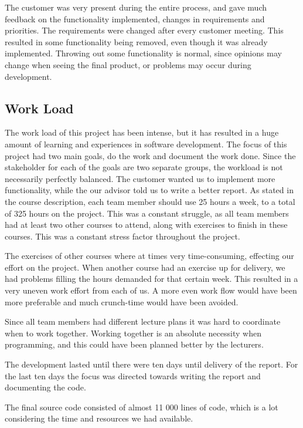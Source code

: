 The customer was very present during the entire process, and gave much feedback on the functionality implemented, changes in requirements and priorities. The requirements were changed after every customer meeting. This resulted in some functionality being removed, even though it was already implemented. Throwing out some functionality is normal, since opinions may change when seeing the final product, or problems may occur during development. 



\subsection{Work Load}
The work load of this project has been intense, but it has resulted in a huge amount of learning and experiences in software development.
The focus of this project had two main goals, do the work and document the work done. Since the stakeholder for each of the goals are two separate groups, the workload is not necessarily perfectly balanced. The customer wanted us to implement more functionality, while the our advisor told us to write a better report. As stated in the course description, each team member should use 25 hours a week, to a total of 325 hours on the project. This was a constant struggle, as all team members had at least two other courses to attend, along with exercises to finish in these courses. This was a constant stress factor throughout the project.

The exercises of other courses where at times very time-consuming, effecting our effort on the project. When another course had an exercise up for delivery, we had problems filling the hours demanded for that certain week. This resulted in a very uneven work effort from each of us. A more even work flow would have been more preferable and much crunch-time would have been avoided. 

Since all team members had different lecture plans it was hard to coordinate when to work together. Working together is an absolute necessity when programming, and this could have been planned better by the lecturers.

The development lasted until there were ten days until delivery of the report. For the last ten days the focus was directed towards writing the report and documenting the code. 

The final source code consisted of almost 11 000 lines of code, which is a lot considering the time and resources we had available. 


